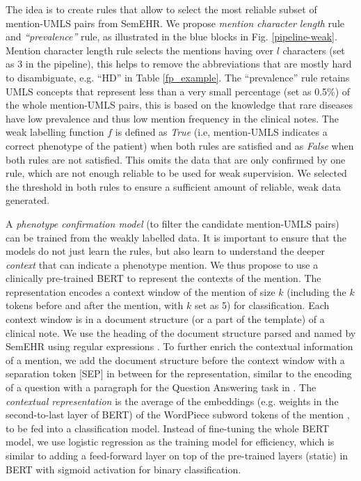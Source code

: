 \documentclass[letterpaper, 10 pt, conference]{ieeeconf}
\begin{document}
The idea is to create rules that allow to select the most reliable subset of mention-UMLS pairs from SemEHR. We propose \textit{mention character length} rule and \textit{``prevalence''} rule, as illustrated in the blue blocks in Fig. \ref{pipeline-weak}. Mention character length rule selects the mentions having over $l$ characters (set as 3 in the pipeline), this helps to remove the abbreviations that are mostly hard to disambiguate, e.g. ``HD'' in Table \ref{fp_example}. The ``prevalence'' rule retains UMLS concepts that represent less than a very small percentage (set as 0.5\%) of the whole mention-UMLS pairs, this is based on the knowledge that rare diseases have low prevalence \cite{scot_gov_2021,textoris_genetic_2014} and thus low mention frequency in the clinical notes. The weak labelling function $f$ is defined as \emph{True} (i.e, mention-UMLS indicates a correct phenotype of the patient) when both rules are satisfied and as \emph{False} when both rules are not satisfied. This omits the data that are only confirmed by one rule, which are not enough reliable to be used for weak supervision. We selected the threshold in both rules to ensure a sufficient amount of reliable, weak data generated.

A \emph{phenotype confirmation model} (to filter the candidate mention-UMLS pairs) can be trained from the weakly labelled data. It is important to ensure that the models do not just learn the rules, but also learn to understand the deeper \textit{context} that can indicate a phenotype mention. We thus propose to use a clinically pre-trained BERT to represent the contexts of the mention. The representation encodes a context window of the mention of size $k$ (including the $k$ tokens before and after the mention, with $k$ set as 5) for classification. Each context window is in a document structure (or a part of the template) of a clinical note. We use the heading of the document structure parsed and named by SemEHR using regular expressions \cite{Wu2018semehr}. To further enrich the contextual information of a mention, we add the document structure before the context window with a separation token [SEP] in between for the representation, similar to the encoding of a question with a paragraph for the Question Answering task in \cite{devlin-etal-2019-bert}. The \emph{contextual representation} is the average of the embeddings (e.g. weights in the second-to-last layer of BERT) of the WordPiece subword tokens of the mention \cite{devlin-etal-2019-bert}, to be fed into a classification model. Instead of fine-tuning the whole BERT model, we use logistic regression as the training model for efficiency, which is similar to adding a feed-forward layer on top of the pre-trained layers (static) in BERT with sigmoid activation for binary classification.
\end{document}

